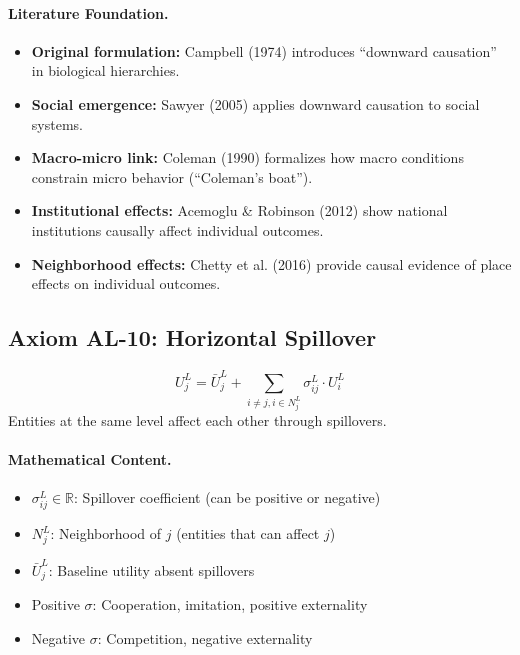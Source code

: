 \paragraph{Literature Foundation.}
\begin{itemize}
\item \textbf{Original formulation:} Campbell (1974) introduces ``downward causation'' 
in biological hierarchies.
\item \textbf{Social emergence:} Sawyer (2005) applies downward causation to 
social systems.
\item \textbf{Macro-micro link:} Coleman (1990) formalizes how macro conditions 
constrain micro behavior (``Coleman's boat'').
\item \textbf{Institutional effects:} Acemoglu \& Robinson (2012) show national 
institutions causally affect individual outcomes.
\item \textbf{Neighborhood effects:} Chetty et al. (2016) provide causal evidence 
of place effects on individual outcomes.
\end{itemize}

\subsection{Axiom AL-10: Horizontal Spillover}

\begin{tcolorbox}[colback=gray!5!white, colframe=gray!75!black, title=Axiom AL-10: Horizontal Spillover]
\begin{equation}
\boxed{
U^L_j = \bar{U}^L_j + \sum_{i \neq j, i \in N^L_j} \sigma^L_{ij} \cdot U^L_i
}
\end{equation}
Entities at the same level affect each other through spillovers.
\end{tcolorbox}

\paragraph{Mathematical Content.}
\begin{itemize}
\item $\sigma^L_{ij} \in \mathbb{R}$: Spillover coefficient (can be positive or negative)
\item $N^L_j$: Neighborhood of $j$ (entities that can affect $j$)
\item $\bar{U}^L_j$: Baseline utility absent spillovers
\item Positive $\sigma$: Cooperation, imitation, positive externality
\item Negative $\sigma$: Competition, negative externality
\end{itemize}


